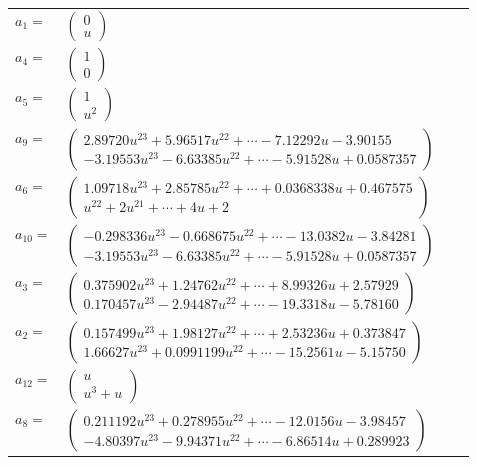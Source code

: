 \documentclass[1p]{elsarticle_modified}
\theoremstyle{definition}
\begin{document}
\begin{tabular}{m{7pt} m{180pt} m{7pt} m{180pt} }
\flushright $a_{1}=$&$\begin{pmatrix}0\\u\end{pmatrix}$ \\
\flushright $a_{4}=$&$\begin{pmatrix}1\\0\end{pmatrix}$ \\
\flushright $a_{5}=$&$\begin{pmatrix}1\\u^2\end{pmatrix}$ \\
\flushright $a_{9}=$&$\begin{pmatrix}2.89720 u^{23}+5.96517 u^{22}+\cdots-7.12292 u-3.90155\\-3.19553 u^{23}-6.63385 u^{22}+\cdots-5.91528 u+0.0587357\end{pmatrix}$ \\
\flushright $a_{6}=$&$\begin{pmatrix}1.09718 u^{23}+2.85785 u^{22}+\cdots+0.0368338 u+0.467575\\u^{22}+2 u^{21}+\cdots+4 u+2\end{pmatrix}$ \\
\flushright $a_{10}=$&$\begin{pmatrix}-0.298336 u^{23}-0.668675 u^{22}+\cdots-13.0382 u-3.84281\\-3.19553 u^{23}-6.63385 u^{22}+\cdots-5.91528 u+0.0587357\end{pmatrix}$ \\
\flushright $a_{3}=$&$\begin{pmatrix}0.375902 u^{23}+1.24762 u^{22}+\cdots+8.99326 u+2.57929\\0.170457 u^{23}-2.94487 u^{22}+\cdots-19.3318 u-5.78160\end{pmatrix}$ \\
\flushright $a_{2}=$&$\begin{pmatrix}0.157499 u^{23}+1.98127 u^{22}+\cdots+2.53236 u+0.373847\\1.66627 u^{23}+0.0991199 u^{22}+\cdots-15.2561 u-5.15750\end{pmatrix}$ \\
\flushright $a_{12}=$&$\begin{pmatrix}u\\u^3+u\end{pmatrix}$ \\
\flushright $a_{8}=$&$\begin{pmatrix}0.211192 u^{23}+0.278955 u^{22}+\cdots-12.0156 u-3.98457\\-4.80397 u^{23}-9.94371 u^{22}+\cdots-6.86514 u+0.289923\end{pmatrix}$ \\

\end{tabular}
\end{document}
